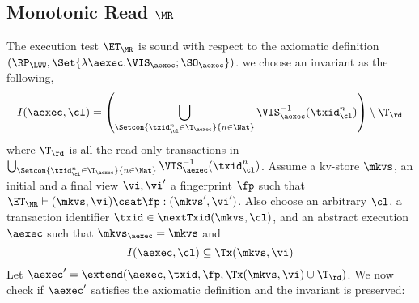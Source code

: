 \subsection{Monotonic Read \( \MR \)}
\label{sec:sound-complete-mr}

The execution test $\ET_\MR$ is sound with respect to the axiomatic definition $(\RP_{\LWW}, \Set{\lambda \aexec. \VIS_{\aexec} ; \SO_{\aexec} })$. 
we choose an invariant as the following,  
\[
    I(\aexec, \cl) = \left( \bigcup_{\Setcon{\txid_{\cl}^{n} \in \T_{\aexec} }{ n \in \Nat}} \VIS_{\aexec}^{-1}(\txid^n_\cl) \right) \setminus \T_\rd
\]
where \( \T_\rd \) is all the read-only transactions in 
\( \bigcup_{\Setcon{\txid_{\cl}^{n} \in \T_{\aexec} }{ n \in \Nat}} \VIS_{\aexec}^{-1}(\txid^n_\cl) \).
Assume a kv-store $\mkvs$, an initial and a final view $\vi, \vi'$  a fingerprint $\fp$ 
such that $\ET_{\MR} \vdash (\mkvs, \vi) \csat \fp: (\mkvs',\vi')$. 
Also choose an arbitrary $\cl$, a transaction identifier $\txid \in \nextTxid(\mkvs, \cl)$, 
and an abstract execution $\aexec$ such that $\mkvs_{\aexec} = \mkvs$ and 
\begin{equation}
I(\aexec, \cl) \subseteq \Tx(\mkvs, \vi)
\label{eq:mr_invariant}
\end{equation}
Let \( \aexec' = \extend(\aexec, \txid, \fp, \Tx(\mkvs, \vi) \cup \T_\rd) \).
We now check if \( \aexec' \) satisfies the axiomatic definition and the invariant is preserved:
